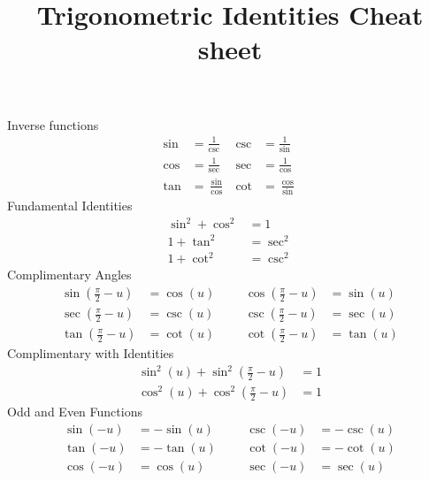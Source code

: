 \documentclass{article}
\title{\vspace{-5ex}Trigonometric Identities Cheat sheet  \vspace{-5ex}}
\author{}
\date{}
\newcommand{\nine}{\frac{\pi}{2}}
\begin{document}
	\maketitle{}
	
	Inverse functions
	\begin{align*}
		\sin &= \frac{1}{\csc}  & \csc & = \frac{1}{\sin} \\
		\cos &= \frac{1}{\sec} & \sec & = \frac{1}{\cos} \\
		\tan &= \frac{\sin}{\cos}  & \cot & = \frac{\cos}{\sin}
	\end{align*}
	Fundamental Identities
	\begin{align*}
		\sin^2 + \cos^2 &= 1 \\
		1 + \tan^2 &= \sec^2 \\
		1 + \cot^2 &= \csc^2
	\end{align*}
	Complimentary Angles
	\begin{align*}
		\sin(\nine - u) &= \cos(u)  & & & \cos(\nine - u) &= \sin(u) \\
		\sec(\nine - u) &= \csc(u) & & & \csc(\nine - u) &= \sec(u) \\
		\tan(\nine - u) &= \cot(u) & & & \cot(\nine - u) &= \tan(u)
	\end{align*}
	Complimentary with Identities
	\begin{align*}
		\sin^2(u) + \sin^2(\frac{\pi}{2} - u) &= 1 \\
		\cos^2(u) + \cos^2(\frac{\pi}{2} - u) &= 1
	\end{align*}
	Odd and Even Functions
	\begin{align*}
		\sin(-u) &= -\sin(u)  & & & \csc(-u) &= -\csc(u) \\
		\tan(-u) &= -\tan(u) & & & \cot(-u) &= -\cot(u) \\
		\cos(-u) &= \cos(u) & & & \sec(-u) &= \sec(u)
	\end{align*}
\end{document}

